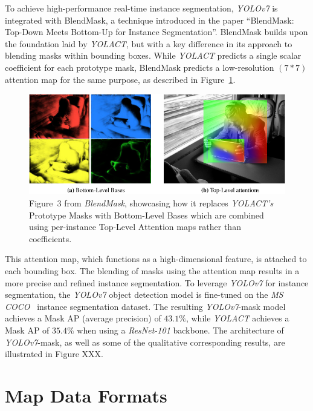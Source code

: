 To achieve high-performance real-time instance segmentation, \textit{YOLOv7} is integrated with BlendMask, a technique introduced in the paper \enquote{BlendMask: Top-Down Meets Bottom-Up for Instance Segmentation}.
BlendMask builds upon the foundation laid by \textit{YOLACT}, but with a key difference in its approach to blending masks within bounding boxes.
While \textit{YOLACT} predicts a single scalar coefficient for each prototype mask, BlendMask predicts a low-resolution $(7*7)$ attention map for the same purpose, as described in Figure~\ref{fig:blendmask}.

\begin{figure}[htb]
    \includegraphics[width=\linewidth]{figures/blendmask_fig_3-cropped}
    \caption{Figure~3 from \textit{BlendMask}, showcasing how it replaces \textit{YOLACT's} Prototype Masks with Bottom-Level Bases which are combined using per-instance Top-Level Attention maps rather than coefficients.}
    \label{fig:blendmask}
\end{figure}

This attention map, which functions as a high-dimensional feature, is attached to each bounding box.
The blending of masks using the attention map results in a more precise and refined instance segmentation.
To leverage \textit{YOLOv7} for instance segmentation, the \textit{YOLOv7} object detection model is fine-tuned on the \textit{MS COCO}~\cite{lin2014microsoft} instance segmentation dataset.
The resulting \textit{YOLOv7}-mask model achieves a Mask AP (average precision) of $43.1\%$, while \textit{YOLACT} achieves a Mask AP of $35.4\%$ when using a \textit{ResNet-101} backbone.
The architecture of \textit{YOLOv7}-mask, as well as some of the qualitative corresponding results, are illustrated in Figure XXX.


\section{Map Data Formats}
\label{sec:opendrive}

